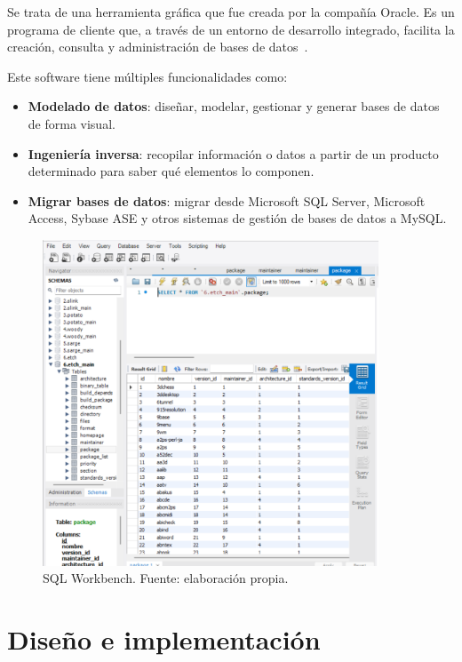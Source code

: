 \documentclass[a4paper, 12pt]{book}
\begin{document}
Se trata de una herramienta gráfica que fue creada por la compañía Oracle.
Es un programa de cliente que, a través de un entorno de desarrollo integrado, facilita la creación, consulta y administración de bases de datos~\cite{mysql:_workbench}. 

Este software tiene múltiples funcionalidades como:
\begin{itemize}
	\item \textbf {Modelado de datos}: diseñar, modelar, gestionar y generar bases de datos de forma visual. 
	\item \textbf {Ingeniería inversa}: recopilar información o datos a partir de un producto determinado para saber qué elementos lo componen. 
	\item \textbf {Migrar bases de datos}: migrar desde Microsoft SQL Server, Microsoft Access, Sybase ASE y otros sistemas de gestión de bases de datos a MySQL.
\end{itemize}

\begin{figure}[hb]
	\centering
	\includegraphics[width=10cm, keepaspectratio]{img/workbench.png}
	\caption{SQL Workbench. Fuente: elaboración propia.}
	\label{fig:workbench}
\end{figure}

\cleardoublepage
\chapter{Diseño e implementación}
\label{sec:diseno}
\end{document}
